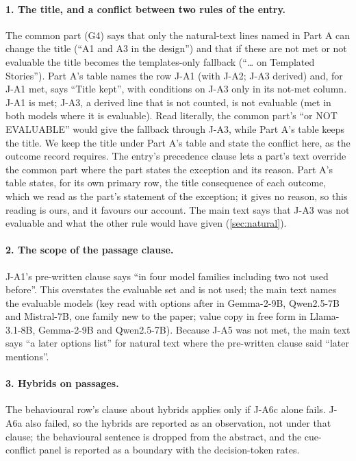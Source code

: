 \paragraph{1. The title, and a conflict between two rules of the entry.} The common part (G4) says that only the natural-text lines named in Part A can change the title (``A1 and A3 in the design'') and that if these are not met or not evaluable the title becomes the templates-only fallback (``\ldots{} on Templated Stories''). Part A's table names the row J-A1 (with J-A2; J-A3 derived) and, for J-A1 met, says ``Title kept'', with conditions on J-A3 only in its not-met column. J-A1 is met; J-A3, a derived line that is not counted, is not evaluable (met in both models where it is evaluable). Read literally, the common part's ``or NOT EVALUABLE'' would give the fallback through J-A3, while Part A's table keeps the title. We keep the title under Part A's table and state the conflict here, as the outcome record requires. %
The entry's precedence clause lets a part's text override the common part where the part states the exception and its reason. Part A's table states, for its own primary row, the title consequence of each outcome, which we read as the part's statement of the exception; it gives no reason, so this reading is ours, and it favours our account. The main text says that J-A3 was not evaluable and what the other rule would have given (\cref{sec:natural}).

\paragraph{2. The scope of the passage clause.} J-A1's pre-written clause says ``in four model families including two not used before''. This overstates the evaluable set and is not used; the main text names the evaluable models (key read with options after in Gemma-2-9B, Qwen2.5-7B and Mistral-7B, one family new to the paper; value copy in free form in Llama-3.1-8B, Gemma-2-9B and Qwen2.5-7B). Because J-A5 was not met, the main text says ``a later options list'' for natural text where the pre-written clause said ``later mentions''. %

\paragraph{3. Hybrids on passages.} The behavioural row's clause about hybrids applies only if J-A6c alone fails. J-A6a also failed, so the hybrids are reported as an observation, not under that clause; the behavioural sentence is dropped from the abstract, and the cue-conflict panel is reported as a boundary with the decision-token rates.

